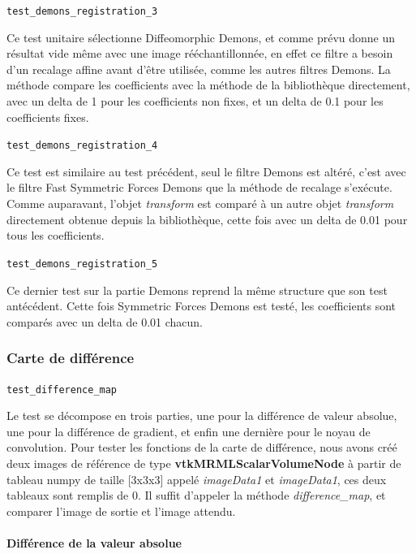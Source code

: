 \documentclass{article}
\newcommand{\subsubsubsection}[1]{\paragraph{#1}\par\noindent\bigskip}
\newcommand{\method}[1]{\hspace{1in}\texttt{#1}\bigskip}
\begin{document}
{{{            \bigskip
            \method{test\_demons\_registration\_3}

            Ce test unitaire sélectionne Diffeomorphic Demons, et comme prévu donne un résultat vide même avec une image rééchantillonnée, en effet ce filtre a besoin d'un recalage affine avant d'être utilisée, comme les autres filtres Demons. La méthode compare les coefficients avec la méthode de la bibliothèque directement, avec un delta de 1 pour les coefficients non fixes, et un delta de 0.1 pour les coefficients fixes.

            \bigskip
            \method{test\_demons\_registration\_4}

            Ce test est similaire au test précédent, seul le filtre Demons est altéré, c'est avec le filtre Fast Symmetric Forces Demons que la méthode de recalage s'exécute. Comme auparavant, l'objet \textit{transform} est comparé à un autre objet \textit{transform} directement obtenue depuis la bibliothèque, cette fois avec un delta de 0.01 pour tous les coefficients.

            \bigskip
            \method{test\_demons\_registration\_5}

            Ce dernier test sur la partie Demons reprend la même structure que son test antécédent. Cette fois Symmetric Forces Demons est testé, les coefficients sont comparés avec un delta de 0.01 chacun.
        }

        {
            \subsubsection{Carte de différence}
            \label{subsubsec:difference-map-unit-testing}

            \method{test\_difference\_map}

            Le test se décompose en trois parties, une pour la différence de valeur absolue, une pour la différence de gradient, et enfin une dernière pour le noyau de convolution. Pour tester les fonctions de la carte de différence, nous avons créé deux images de référence de type \textbf{vtkMRMLScalarVolumeNode} à partir de tableau numpy de taille [3x3x3] appelé \textit{imageData1} et \textit{imageData1}, ces deux tableaux sont remplis de 0. Il suffit d'appeler la méthode \textit{difference\_map}, et comparer l'image de sortie et l'image attendu.

            \subsubsubsection{Différence de la valeur absolue}

}}}
\end{document}
